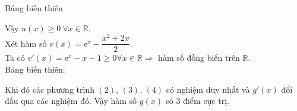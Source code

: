 \begin{ex}
{		Bảng biến thiên 
		\begin{center}
		\end{center}
		\noindent	Vậy $u(x)\ge 0~\forall x\in\mathbb{R}$.\\
		Xét hàm số $v(x)=\mathrm{e}^x-\dfrac{x^2+2x}{2}$.\\
		Ta có $v'(x)=\mathrm{e}^x-x-1\ge 0\forall x\in\mathbb{R}\Rightarrow$ hàm số đồng biến trên $\mathbb{R}$.\\
		Bảng biến thiên: 
		\begin{center}
		\end{center}
		Khi đó các phương trình $(2)$, $(3)$, $(4)$ có nghiệm duy nhất và $g'(x)$ đổi dấu qua các nghiệm đó. Vậy hàm số $g(x)$ có $3$ điểm cực trị.
	}
\end{ex}
